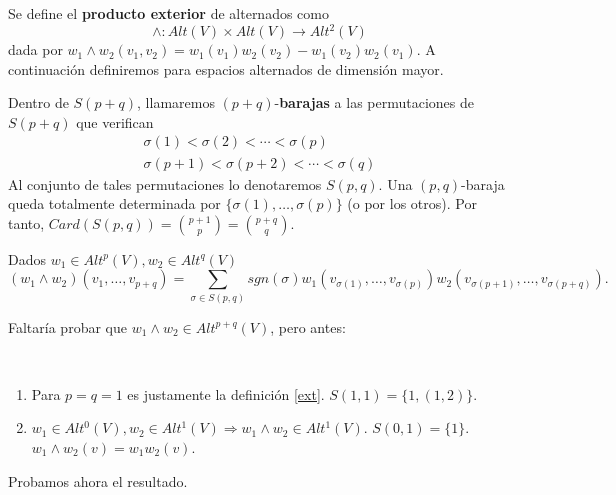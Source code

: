 \documentclass[CV.tex]{subfiles}
\begin{document}
\begin{defi}\label{ext}
Se define el \textbf{producto exterior} de alternados como 
$$\land:Alt(V)\times Alt(V)\to Alt^2(V)$$
dada por $w_1\land w_2(v_1,v_2)=w_1(v_1)w_2(v_2)-w_1(v_2)w_2(v_1)$. A continuación definiremos para espacios alternados de dimensión mayor.
\end{defi}
\begin{defi}
Dentro de $S(p+q)$, llamaremos $(p+q)$-\textbf{barajas} a las permutaciones de $S(p+q)$ que verifican
\begin{gather*}
\sigma(1)<\sigma(2)<\cdots<\sigma(p)\\
\sigma(p+1)<\sigma(p+2)<\cdots<\sigma(q)
\end{gather*}
Al conjunto de tales permutaciones lo denotaremos $S(p,q)$. Una $(p,q)$-baraja queda totalmente determinada por $\{\sigma(1),\dots, \sigma(p)\}$ (o por los otros). Por tanto, $Card(S(p,q))=\binom{p+1}{p}=\binom{p+q}{q}$.
\end{defi}
\begin{defi}
Dados $w_1\in Alt^p(V),w_2\in Alt^q(V)$
$$
(w_1\land w_2)(v_1,\dots, v_{p+q})=\sum_{\sigma\in S(p,q)} sgn(\sigma)w_1(v_{\sigma(1)},\dots, v_{\sigma(p)})w_2(v_{\sigma(p+1)},\dots, v_{\sigma(p+q)}).$$
\end{defi}
Faltaría probar que $w_1\land w_2\in Alt^{p+q}(V)$, pero antes:
\begin{nota}\
\begin{enumerate}
\item Para $p=q=1$ es justamente la definición \ref{ext}. $S(1,1)=\{1,(1,2)\}$.
\item $w_1\in Alt^0(V), w_2\in Alt^1(V)\Rightarrow w_1\land w_2\in Alt^1(V)$. $S(0,1)=\{1\}$. $w_1\land w_2(v)=w_1 w_2(v)$.
\end{enumerate}
\end{nota}
Probamos ahora el resultado. 
\end{document}
